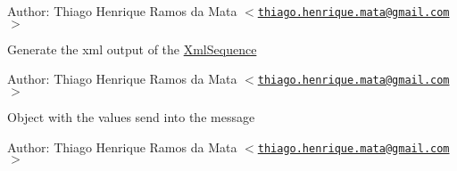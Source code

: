 \begin{Desc}
\item[Author:]Thiago Henrique Ramos da Mata $<$\href{mailto:thiago.henrique.mata@gmail.com}{\tt thiago.henrique.mata@gmail.com}$>$\end{Desc}
Generate the xml output of the \hyperlink{class_xml_sequence}{XmlSequence} \begin{Desc}
\item[Author:]Thiago Henrique Ramos da Mata $<$\href{mailto:thiago.henrique.mata@gmail.com}{\tt thiago.henrique.mata@gmail.com}$>$\end{Desc}
Object with the values send into the message \begin{Desc}
\item[Author:]Thiago Henrique Ramos da Mata $<$\href{mailto:thiago.henrique.mata@gmail.com}{\tt thiago.henrique.mata@gmail.com}$>$ \end{Desc}


